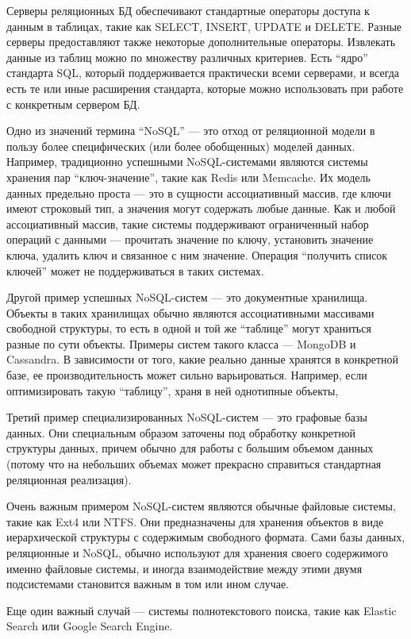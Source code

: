 Серверы реляционных БД обеспечивают стандартные операторы доступа к данным в таблицах, такие как SELECT, INSERT, UPDATE и DELETE. Разные серверы предоставляют также некоторые дополнительные операторы. Извлекать данные из таблиц можно по множеству различных критериев. Есть “ядро” стандарта SQL, который поддерживается практически всеми серверами, и всегда есть те или иные расширения стандарта, которые можно использовать при работе с конкретным сервером БД.

Одно из значений термина “NoSQL” — это отход от реляционной модели в пользу более специфических (или более обобщенных) моделей данных. Например, традиционно успешными NoSQL-системами являются системы хранения пар “ключ-значение”, такие как Redis или Memcache. Их модель данных предельно проста — это в сущности ассоциативный массив, где ключи имеют строковый тип, а значения могут содержать любые данные. Как и любой ассоциативный массив, такие системы поддерживают ограниченный набор операций с данными — прочитать значение по ключу, установить значение ключа, удалить ключ и связанное с ним значение. Операция “получить список ключей” может не поддерживаться в таких системах. 

Другой пример успешных NoSQL-систем — это документные хранилища. Объекты в таких хранилищах обычно являются ассоциативными массивами свободной структуры, то есть в одной и той же “таблице” могут храниться разные по сути объекты. Примеры систем такого класса — MongoDB и Cassandra. В зависимости от того, какие реально данные хранятся в конкретной базе, ее производительность может сильно варьироваться. Например, если оптимизировать такую “таблицу”, храня в ней однотипные объекты, 

Третий пример специализированных NoSQL-систем — это графовые базы данных. Они специальным образом заточены под обработку конкретной структуры данных, причем обычно для работы с большим объемом данных (потому что на небольших объемах может прекрасно справиться стандартная реляционная реализация).

Очень важным примером NoSQL-систем являются обычные файловые системы, такие как Ext4 или NTFS. Они предназначены для хранения объектов в виде иерархической структуры с содержимым свободного формата. Сами базы данных, реляционные и NoSQL, обычно используют для хранения своего содержимого именно файловые системы, и иногда взаимодействие между этими двумя подсистемами становится важным в том или ином случае.

Еще один важный случай — системы полнотекстового поиска, такие как Elastic Search или Google Search Engine. 